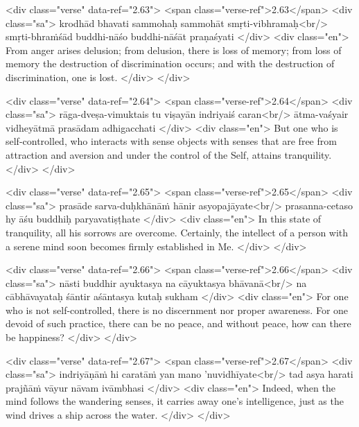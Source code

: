 \begin{html}
<div class="verse" data-ref="2.63">
  <span class="verse-ref">2.63</span>
  <div class="sa">
    krodhād bhavati sammohaḥ sammohāt smṛti-vibhramaḥ<br/>
    smṛti-bhraṁśād buddhi-nāśo buddhi-nāśāt praṇaśyati
  </div>
  <div class="en">
    From anger arises delusion; from delusion, there is loss of memory; from loss of memory the destruction of discrimination occurs; and with the destruction of discrimination, one is lost.
  </div>
</div>
\end{html}



\begin{html}
<div class="verse" data-ref="2.64">
  <span class="verse-ref">2.64</span>
  <div class="sa">
    rāga-dveṣa-vimuktais tu viṣayān indriyaiś caran<br/>
    ātma-vaśyair vidheyātmā prasādam adhigacchati
  </div>
  <div class="en">
    But one who is self-controlled, who interacts with sense objects with senses that are free from attraction and aversion and under the control of the Self, attains tranquility.
  </div>
</div>
\end{html}



\begin{html}
<div class="verse" data-ref="2.65">
  <span class="verse-ref">2.65</span>
  <div class="sa">
    prasāde sarva-duḥkhānāṁ hānir asyopajāyate<br/>
    prasanna-cetaso hy āśu buddhiḥ paryavatiṣṭhate
  </div>
  <div class="en">
    In this state of tranquility, all his sorrows are overcome. Certainly, the intellect of a person with a serene mind soon becomes firmly established in Me.
  </div>
</div>
\end{html}



\begin{html}
<div class="verse" data-ref="2.66">
  <span class="verse-ref">2.66</span>
  <div class="sa">
    nāsti buddhir ayuktasya na cāyuktasya bhāvanā<br/>
    na cābhāvayataḥ śāntir aśāntasya kutaḥ sukham
  </div>
  <div class="en">
    For one who is not self-controlled, there is no discernment nor proper awareness. For one devoid of such practice, there can be no peace, and without peace, how can there be happiness?
  </div>
</div>
\end{html}



\begin{html}
<div class="verse" data-ref="2.67">
  <span class="verse-ref">2.67</span>
  <div class="sa">
    indriyāṇāṁ hi caratāṁ yan mano ’nuvidhīyate<br/>
    tad asya harati prajñāṁ vāyur nāvam ivāmbhasi
  </div>
  <div class="en">
    Indeed, when the mind follows the wandering senses, it carries away one’s intelligence, just as the wind drives a ship across the water.
  </div>
</div>
\end{html}



